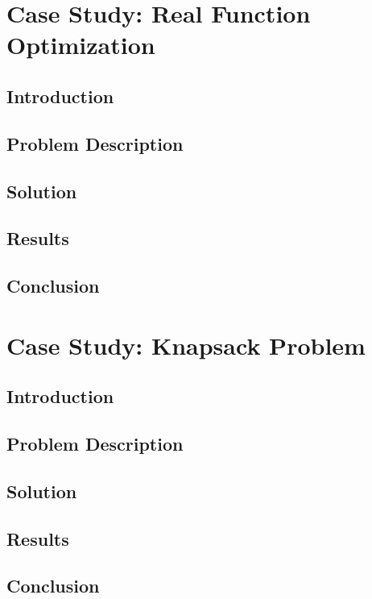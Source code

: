 \chapter{Case Study: Real Function Optimization}
\label{chap:case_study_real_function_optimization}
  \section{Introduction}
  \label{sec:introduction}
    \Blindtext
  \section{Problem Description}
  \label{sec:problem_description}
    \Blindtext
  \section{Solution}
  \label{sec:solution}
    \Blindtext
  \section{Results}
  \label{sec:results}
    \Blindtext
  \section{Conclusion}
  \label{sec:conclusion}
    \Blindtext

\chapter{Case Study: Knapsack Problem}
\label{chap:case_study_knapsack}
  \section{Introduction}
  \label{sec:introduction}
    \Blindtext
  \section{Problem Description}
  \label{sec:problem_description}
    \Blindtext
  \section{Solution}
  \label{sec:solution}
    \Blindtext
  \section{Results}
  \label{sec:results}
    \Blindtext
  \section{Conclusion}
  \label{sec:conclusion}
    \Blindtext

